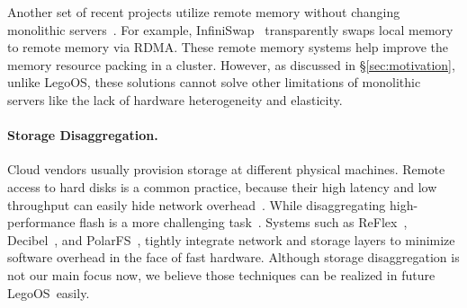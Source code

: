 \documentclass[10pt,times,twocolumn]{z2-article}
\newcommand{\boldparagraph}[1]{\vspace*{1ex}\noindent\textit{#1}\hspace{1em}}
\newcommand{\lego}{LegoOS}
\providecommand{\DIFdelbegin}{} %
\newcommand{\DIFscaledelfig}{0.5}
\newlength{\DIFdelgraphicswidth} %
\newlength{\DIFdelgraphicsheight} %
\newcommand{\DIFdelincludegraphics}[2][]{%
\sbox{\DIFdelgraphicsbox}{\DIFOincludegraphics[#1]{#2}}%
\settoboxwidth{\DIFdelgraphicswidth}{\DIFdelgraphicsbox} %
\settoboxtotalheight{\DIFdelgraphicsheight}{\DIFdelgraphicsbox} %
\scalebox{\DIFscaledelfig}{%
\parbox[b]{\DIFdelgraphicswidth}{\usebox{\DIFdelgraphicsbox}\\[-\baselineskip] \rule{\DIFdelgraphicswidth}{0em}}\llap{\resizebox{\DIFdelgraphicswidth}{\DIFdelgraphicsheight}{%
\setlength{\unitlength}{\DIFdelgraphicswidth}%
\begin{picture}(1,1)%
\thicklines\linethickness{2pt} %
{\color[rgb]{1,0,0}\put(0,0){\framebox(1,1){}}}%
{\color[rgb]{1,0,0}\put(0,0){\line( 1,1){1}}}%
{\color[rgb]{1,0,0}\put(0,1){\line(1,-1){1}}}%
\end{picture}%
}\hspace*{3pt}}} %
} %
\DeclareRobustCommand{\DIFdelbegin}{\DIFOdelbegin \let\includegraphics\DIFdelincludegraphics} %
\begin{document}
{{{{{{{Another set of recent projects utilize remote memory without changing 
monolithic servers~\cite{Dragojevic14-FaRM,Nelson15-ATC,remote-region-atc18,GU17-NSDI,Novakovic16-SOCC,hotpot-socc17}.
For example, InfiniSwap~\cite{GU17-NSDI} transparently swaps local memory to remote memory via RDMA.
These remote memory systems help improve the memory resource packing in a cluster.
However, as discussed in \S\ref{sec:motivation}, unlike \lego, these solutions cannot solve other limitations 
of monolithic servers like the lack of hardware heterogeneity and elasticity. 

\paragraph{Storage Disaggregation.}
Cloud vendors usually provision storage at different physical machines\cite{deepview-nsdi18,url:aws-storage,url:vmware-vSAN}.
Remote access to hard disks is a common practice, because their high latency and low throughput
can easily hide network overhead~\cite{petal-asplos96,blizzard-nsdi14,Parallax-hotos15,Legtchenko-hotstorage17}.
While disaggregating high-performance flash is a more challenging task~\cite{FlashDisaggregation,url:facebook-lighting}.
Systems such as ReFlex~\cite{ReFlex}, Decibel~\cite{decibel-nsdi17}, and PolarFS~\cite{PolarFS-VLDB18},
tightly integrate network and storage layers to minimize software overhead in the face of fast hardware.
Although storage disaggregation is not our main focus now,
we believe those techniques can be realized in future \lego\ easily.

\DIFdelbegin %

}}}}}}}
\end{document}
